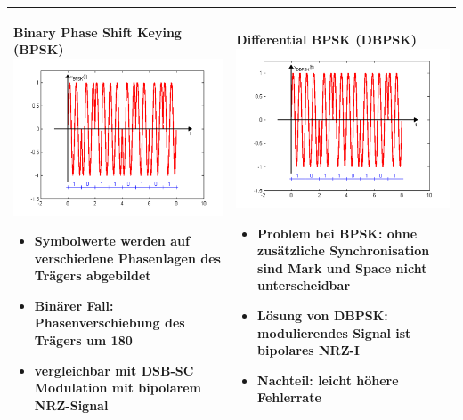 \begin{longtable}{|p{9cm}|p{9cm}|}
	\textbf{Binary Phase Shift Keying (BPSK)}\newline
	\includegraphics[width=8cm]{bilder/DigitaleTraegermodulation/BPSK.png}
	\begin{itemize}[noitemsep]
		\item Symbolwerte werden auf verschiedene Phasenlagen des Trägers abgebildet
		\item Binärer Fall: Phasenverschiebung des Trägers um 180\textdegree
		\item vergleichbar mit DSB-SC Modulation mit bipolarem NRZ-Signal
	\end{itemize}
	&
	\textbf{Differential BPSK (DBPSK)}\newline
	\includegraphics[width=8cm]{bilder/DigitaleTraegermodulation/DBPSK.png}
	\begin{itemize}[noitemsep]
		\item Problem bei BPSK: ohne zusätzliche Synchronisation sind Mark und Space nicht unterscheidbar
		\item Lösung von DBPSK: modulierendes Signal ist bipolares NRZ-I
		\item Nachteil: leicht höhere Fehlerrate
	\end{itemize}\\
	
	\hline
	

\end{longtable}
